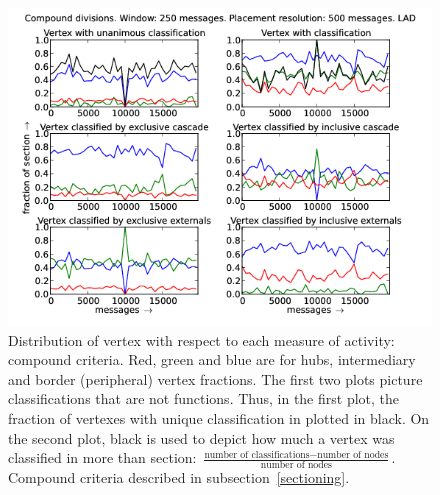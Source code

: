 \documentclass[%
 aip,
 jmp,%
 amsmath,amssymb,
 reprint,%
]{revtex4-1}
\begin{document}
\begin{figure}[hbtp] 
   \centering
        \includegraphics[width=\textwidth]{figs/LAD/250_2}
    \caption{Distribution of vertex with respect to each measure of activity: compound criteria. Red, green and blue are for hubs, intermediary and border (peripheral) vertex fractions. The first two plots picture classifications that are not functions. Thus, in the first plot, the fraction of vertexes with unique classification in plotted in black. On the second plot, black is used to depict how much a vertex was classified in more than section: $\frac{\text{number of classifications} - \text{number of nodes}}{\text{number of nodes}}$. Compound criteria described in subsection~\ref{sectioning}.}
    \label{fig:lad250_}
\end{figure}
\end{document}

